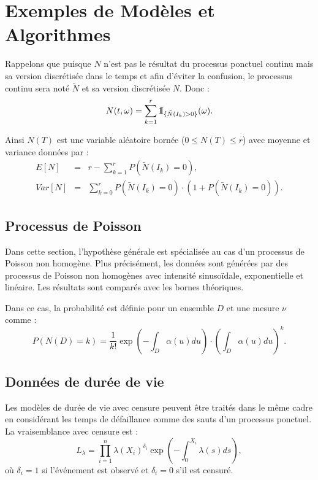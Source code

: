 \documentclass[11pt,a4paper]{article}
\newcommand{\un}{\mbox{\rm 1\hspace{-1mm}I}}
\begin{document}
	\section{Exemples de Modèles et Algorithmes}
	\label{sec:exemples_modeles}
	
	Rappelons que puisque $N$ n'est pas le résultat du processus ponctuel continu mais sa version discrétisée dans le temps et afin d'éviter la confusion, le processus continu sera noté $\tilde{N}$ et sa version discrétisée $N$. Donc :
	\begin{equation}
		N(t,\omega)= \sum_{k=1}^r \un_{\{ \tilde{N}(I_k) > 0 \}}(\omega).
	\end{equation}
	
	Ainsi $N(T)$ est une variable aléatoire bornée ($0 \leq N(T) \leq r$) avec moyenne et variance données par :
	\begin{eqnarray}
		E[N] &=& r - \sum_{k=1}^r P(\tilde{N}(I_k)=0), \\
		Var[N] &=& \sum_{k = 0}^r P(\tilde{N}(I_k) = 0) \cdot \left ( 1 + P(\tilde{N}(I_k) = 0) \right ).
	\end{eqnarray}
	
	\subsection{Processus de Poisson}
	\label{subsec:processus_poisson}
	
	Dans cette section, l'hypothèse générale est spécialisée au cas d'un processus de Poisson non homogène. Plus précisément, les données sont générées par des processus de Poisson non homogènes avec intensité sinusoïdale, exponentielle et linéaire. Les résultats sont comparés avec les bornes théoriques.
	
	Dans ce cas, la probabilité est définie pour un ensemble $D$ et une mesure $\nu$ comme :
	\begin{equation}
		P(N(D) = k)=\frac{1}{k!}\exp \left ( -\int_D \alpha(u)du \right ) \cdot \left ( \int_D \alpha(u)du \right )^k.
	\end{equation}
	
	\subsection{Données de durée de vie}
	\label{subsec:durees_vie}
	
	Les modèles de durée de vie avec censure peuvent être traités dans le même cadre en considérant les temps de défaillance comme des sauts d'un processus ponctuel. La vraisemblance avec censure est :
	\begin{equation}
		L_{\lambda} = \prod_{i=1}^n \lambda(X_i)^{\delta_i} \exp\left( -\int_0^{X_i} \lambda(s) ds \right),
	\end{equation}
	où $\delta_i = 1$ si l'événement est observé et $\delta_i = 0$ s'il est censuré.
	
\end{document}
